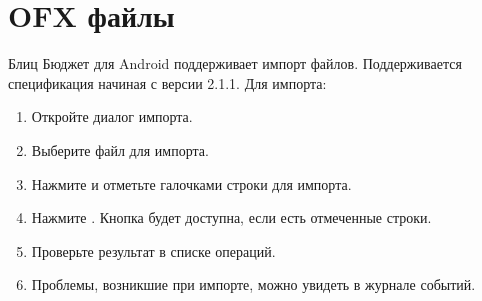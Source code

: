 \documentclass[a4paper,10pt,russian]{sphinxmanual}
\begin{document}
\section{OFX файлы}
\label{\detokenize{import:id6}}
\sphinxAtStartPar
Блиц Бюджет для Android поддерживает импорт  файлов. Поддерживается спецификация начиная с версии 2.1.1. Для импорта:
\begin{enumerate}
%
\item {} 
\sphinxAtStartPar
Откройте диалог импорта.

\item {} 
\sphinxAtStartPar
Выберите файл для импорта.

\item {} 
\sphinxAtStartPar
Нажмите  и отметьте галочками строки для импорта.

\item {} 
\sphinxAtStartPar
Нажмите . Кнопка будет доступна, если есть отмеченные строки.

\item {} 
\sphinxAtStartPar
Проверьте результат в списке операций.

\item {} 
\sphinxAtStartPar
Проблемы, возникшие при импорте, можно увидеть в журнале событий.

\end{enumerate}

\noindent{}
\noindent{}
\end{document}
